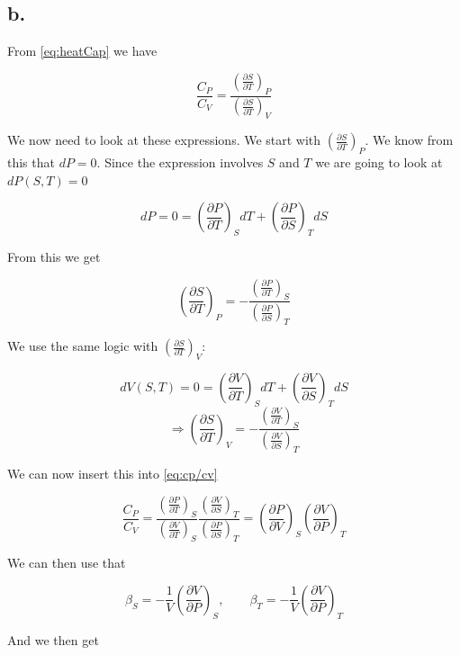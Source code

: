 \documentclass{article}
\newcommand{\pd}[2]{\frac{\partial #1}{\partial #2}}
\begin{document}
\subsection*{b.}

From \eqref{eq:heatCap} we have

\begin{equation}
\frac{C_P}{C_V} = \frac{\left(\pd{S}{T}\right)_P}{\left(\pd{S}{T}\right)_V}
\label{eq:cp/cv}
\end{equation}

We now need to look at these expressions. We start with $\left(\pd{S}{T}\right)_P$. We know from this that $dP = 0$. Since the expression involves $S$ and $T$ we are going to look at $dP(S,T) = 0$

\begin{equation}
dP = 0 = \left(\pd{P}{T}\right)_S dT + \left(\pd{P}{S}\right)_T dS
\end{equation}

From this we get

\begin{equation}
\left(\pd{S}{T}\right)_P = -\frac{\left(\pd{P}{T}\right)_S}{\left(\pd{P}{S}\right)_T}
\end{equation}

We use the same logic with $\left(\pd{S}{T}\right)_V$:

\begin{equation}
dV(S,T) = 0 = \left(\pd{V}{T}\right)_S dT + \left(\pd{V}{S}\right)_T dS
\end{equation}
\begin{equation}
\Rightarrow\left(\pd{S}{T}\right)_V = -\frac{\left(\pd{V}{T}\right)_S}{\left(\pd{V}{S}\right)_T}
\end{equation}

We can now insert this into \eqref{eq:cp/cv}

\begin{equation}
\frac{C_P}{C_V} = \frac{\left(\pd{P}{T}\right)_S}{\left(\pd{V}{T}\right)_S}\frac{\left(\pd{V}{S}\right)_T}{\left(\pd{P}{S}\right)_T} =
\left(\pd{P}{V}\right)_S \left(\pd{V}{P}\right)_T
\end{equation}

We can then use that

\begin{equation}
\beta_S = -\frac{1}{V}\left(\pd{V}{P}\right)_S, \qquad \beta_T = -\frac{1}{V}\left(\pd{V}{P}\right)_T
\end{equation}

And we then get
\end{document}
